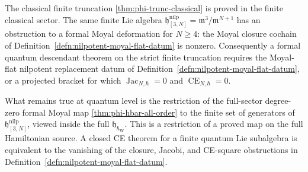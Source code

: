 \begin{thm}
\label{thm:phi-hbar-trunc}
  The classical finite truncation
  \ref{thm:phi-trunc-classical} is proved in the finite classical
  sector.  The same finite
  Lie algebra
  $\mathfrak h^{\mathrm{nilp}}_{[3,N]}=\mathfrak m^3/\mathfrak m^{N+1}$ has an
  obstruction to a formal Moyal deformation for $N\geq4$: the
  Moyal closure cochain of
  Definition~\ref{defn:nilpotent-moyal-flat-datum} is nonzero.
  Consequently a formal quantum descendant theorem on the strict finite
  truncation requires the Moyal-flat nilpotent replacement datum of
  Definition~\ref{defn:nilpotent-moyal-flat-datum}, or a projected
  bracket for which
  \(\operatorname{Jac}_{N,\hbar}=0\) and
  \(\operatorname{CE}_{N,\hbar}=0\).

  What remains true at quantum level is the restriction of the
  full-sector degree-zero formal Moyal map
  \ref{thm:phi-hbar-all-order} to the finite set of generators of
  $\mathfrak h^{\mathrm{nilp}}_{[3,N]}$, viewed inside the full
  $\mathfrak h_{\hbar_{\mathrm{W}}}$.  This is a restriction of a proved map on the
  full Hamiltonian source. A closed CE theorem for a finite quantum Lie
  subalgebra is equivalent to the vanishing of the closure, Jacobi, and
  CE-square obstructions in
  Definition~\ref{defn:nilpotent-moyal-flat-datum}.
\end{thm}

